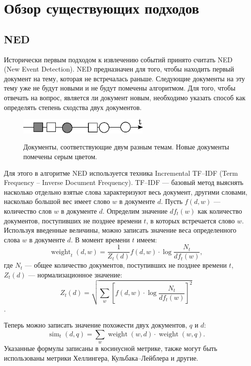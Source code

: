 \documentclass[12pt, a4paper]{article}
\DeclareMathOperator{\weight}{weight}
\DeclareMathOperator{\simu}{sim}
\begin{document}
  \section{Обзор существующих подходов}
  \subsection{NED}
  \label{ned-subsection}
	Исторически первым подходом к извлечению событий принято считать NED (New Event Detection)\cite{ned}. NED предназначен для того, чтобы находить первый документ на тему, которая не встречалась раньше. Следующие документы на эту тему уже не будут новыми и не будут помечены алгоритмом. Для того, чтобы отвечать на вопрос, является ли документ новым, необходимо указать способ как определять степень сходства двух документов.
	
\begin{figure}[H]
  \centering
  \includegraphics[width=0.58\textwidth]{ned.eps}
  \\
  \caption{Документы, соответствующие двум разным темам. Новые документы помечены серым цветом.}
  \end{figure}  

	Для этого в алгоритме NED используется техника Incremental TF--IDF (Term Frequency -- Inverse Document Frequency). TF--IDF --- базовый метод выяснять насколько отдельно взятые слова характеризуют весь документ, другими словами, насколько большой вес имеет слово $w$ в документе $d$. Пусть $f(d,w)$ --- количество слов $w$ в документе $d$. Определим значение $df_t(w)$ как количество документов, поступивших не позднее времени $t$, в которых встречается слово $w$. Используя введенные величины, можно записать значение веса определенного слова $w$ в документе $d$. В момент времени $t$ имеем:
	\begin{equation}
	\weight_t(d,w) = \frac{1}{Z_t(d)}f(d,w) \cdot \log \frac{N_t}{df_t(w)},
	\end{equation}
	где $N_t$ --- общее количество документов, поступивших не позднее времени $t$, $Z_t(d)$ --- нормализационное значение:
	\begin{equation}
	Z_t(d) = \sqrt{\sum_w \left[ f(d,w) \cdot \log \frac{N_t}{df_t(w)} \right]^2}
	\end{equation}.
	
	Теперь можно записать значение похожести двух документов, $q$ и $d$:
	\begin{equation}
	\simu_t(d,q) = \sum_w \weight(w, d) \cdot \weight(w, q).
	\end{equation}
	Указанные формулы записаны в косинусной метрике, также могут быть использованы метрики Хеллингера, Кульбака--Лейблера и другие.
	
\end{document}
